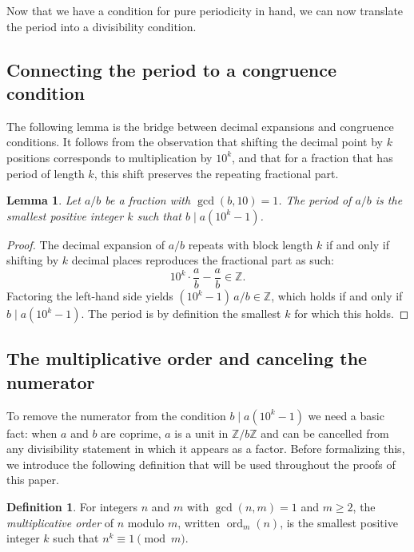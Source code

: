\documentclass[12pt]{amsart}
\newtheorem{lemma}[theorem]{Lemma}
\theoremstyle{definition}
\newtheorem{definition}[theorem]{Definition}
\theoremstyle{remark}
\newcommand{\Z}{\mathbb{Z}}
\newcommand{\ord}{\operatorname{ord}}
\begin{document}
Now that we have a condition for pure periodicity in hand, we can now translate the period into a 
divisibility condition.

\subsection{Connecting the period to a congruence condition}

The following lemma is the bridge between decimal expansions and 
congruence conditions. It follows from the observation that shifting the decimal 
point by $k$ positions corresponds to multiplication by $10^k$, and that for a fraction that has period of length $k$, this shift
preserves the repeating fractional part.

\begin{lemma}\label{lem:period-as-divisibility}
Let $a/b$ be a fraction with $\gcd(b, 10) = 1$. The period of $a/b$ is 
the smallest positive integer $k$ such that $b \mid a(10^k - 1)$.
\end{lemma}

\begin{proof}
The decimal expansion of $a/b$ repeats with block length $k$ if and only 
if shifting by $k$ decimal places reproduces the fractional part as such:
\[
  10^k \cdot \frac{a}{b} - \frac{a}{b} \in \Z.
\]
Factoring the left-hand side yields $(10^k - 1)\,a/b \in \Z$, which 
holds if and only if $b \mid a(10^k - 1)$. The period is by definition 
the smallest $k$ for which this holds.
\end{proof}

\subsection{The multiplicative order and canceling the numerator}

To remove the numerator from the condition $b \mid a(10^k - 1)$ we 
need a basic fact: when $a$ and $b$ are coprime, $a$ is a unit in 
$\Z/b\Z$ and can be cancelled from any divisibility statement in which 
it appears as a factor. Before formalizing this, we introduce the following definition that will be used throughout the proofs of this paper.

\begin{definition}\label{def:order}
For integers $n$ and $m$ with $\gcd(n, m) = 1$ and $m \ge 2$, the 
\emph{multiplicative order} of $n$ modulo $m$, written $\ord_m(n)$, 
is the smallest positive integer $k$ such that $n^k \equiv 1 \pmod{m}$.
\end{definition}
\end{document}
